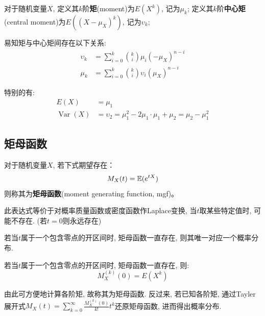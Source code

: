 \begin{definition}
    对于随机变量$X$, 定义其$k$阶\textbf{矩}(moment)为$E(X^k)$, 记为$\mu_k$; 定义其$k$阶\textbf{中心矩}(central moment)为$E((X-\mu_X)^k)$, 记为$\upsilon_k$;
\end{definition}

易知矩与中心矩间存在以下关系:
\begin{align*}
    \upsilon_k & =\sum_{i=0}^k \binom{k}{i} \mu_i (-\mu_X)^{n-i}     \\
    \mu_k      & =\sum_{i=0}^k \binom{k}{i} \upsilon_i (\mu_X)^{n-i}
\end{align*}

特别的有:
\begin{align*}
    E(X)                  & =\mu_1                                                         \\
    \operatorname{Var}(X) & =\upsilon_2=\mu_1^2-2\mu_1 \cdot \mu_1 + \mu_2 = \mu_2-\mu_1^2
\end{align*}

\subsection{矩母函数}

\begin{definition}
    对于随机变量$X$, 若下式期望存在：
    \[ M_X(t) = \mathbb{E}(e^{tX}) \]
    则称其为\textbf{矩母函数}(moment generating function, mgf)。
\end{definition}

\begin{remark}
    此表达式等价于对概率质量函数或密度函数作Laplace变换, 当$t$取某些特定值时, 可能不存在. (若$t=0$则永远存在)
\end{remark}

\begin{theorem}
    若当$t$属于一个包含零点的开区间时, 矩母函数一直存在, 则其唯一对应一个概率分布.
\end{theorem}

\begin{theorem}
    若当$t$属于一个包含零点的开区间时, 矩母函数一直存在, 则:
    \[ M_X^{(k)}(0) = E(X^k) \]
\end{theorem}

\begin{remark}
    由此可方便地计算各阶矩, 故称其为矩母函数. 反过来, 若已知各阶矩, 通过Tayler展开式$M_X(t)=\sum_{k=0}^{\infty}\frac{M_X^{(k)}(0)}{k!}t^k$还原矩母函数, 进而得出概率分布.
\end{remark}

